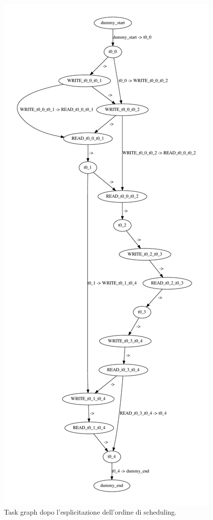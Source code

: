 \begin{figure}[t]
 \begin{center}
  \includegraphics[height=\textheight]{./capitoli/figure/cap6/FinalTaskGraph.pdf}
  \caption{Task graph dopo l'esplicitazione dell'ordine di scheduling.}
  \label{fig:finalTG}
 \end{center}
\end{figure}
